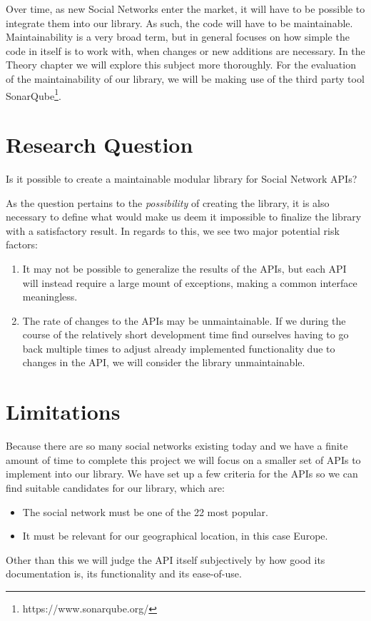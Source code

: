 \documentclass{sigchi-alternate}
\begin{document}
Over time, as new Social Networks enter the market, it will have to be possible to integrate them into our library. As such, the code will have to be maintainable.
Maintainability is a very broad term, but in general focuses on how simple the code in itself is to work with, when changes or new additions are necessary.
In the Theory chapter we will explore this subject more thoroughly. For the evaluation of the maintainability of our library, we will be making use of the third
party tool SonarQube\footnote{https://www.sonarqube.org/}.


\section{Research Question}
Is it possible to create a maintainable modular library for Social Network APIs?

As the question pertains to the \textit{possibility} of creating the library, it is also necessary to define what would make us deem it impossible to finalize
the library with a satisfactory result. In regards to this, we see two major potential risk factors:
\begin{enumerate}
	\item It may not be possible to generalize the results of the APIs, but each API will instead require a large mount of exceptions, making a common interface meaningless.
	\item The rate of changes to the APIs may be unmaintainable. If we during the course of the relatively short development time find ourselves having to go back multiple
	times to adjust already implemented functionality due to changes in the API, we will consider the library unmaintainable.
\end{enumerate}
\section{Limitations}
Because there are so many social networks existing today and we have a finite amount of time to complete this
project we will focus on a smaller set of APIs to implement into our library.  We have set up a few criteria 
for the APIs so we can find suitable candidates for our library, which are:
\begin{itemize}
	\item The social network must be one of the 22 most popular\autocite{STATISTA_LEADING_SOCIAL_NETWORKS}.
	\item It must be relevant for our geographical location, in this case Europe.
\end{itemize}
Other than this we will judge the API itself subjectively by how good its documentation is, its functionality and its ease-of-use. 
\end{document}
